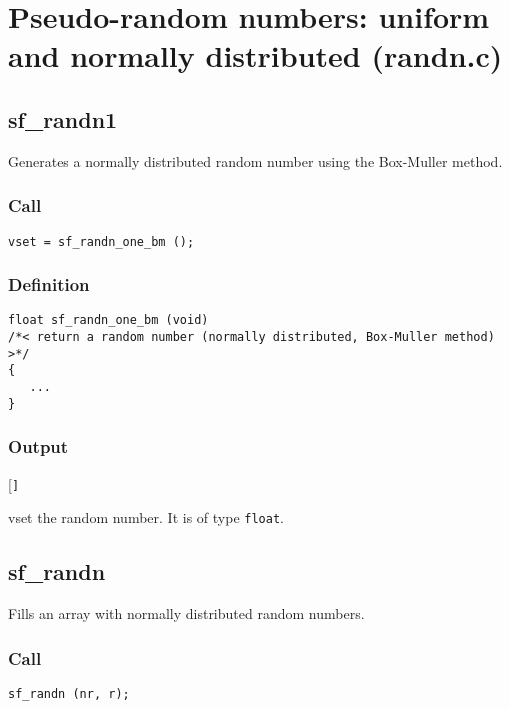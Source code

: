 \section{Pseudo-random numbers: uniform and normally distributed (randn.c)}




\subsection{{sf\_randn1}}
Generates a normally distributed random number using the Box-Muller method.

\subsubsection*{Call}
\begin{verbatim}vset = sf_randn_one_bm ();\end{verbatim}

\subsubsection*{Definition}
\begin{verbatim}
float sf_randn_one_bm (void)
/*< return a random number (normally distributed, Box-Muller method) >*/
{
   ...
}
\end{verbatim}

\subsubsection*{Output}
\begin{desclist}{\tt }{\quad}[\tt ]
   \setlength\itemsep{0pt}
   \item[vset] the random number. It is of type \texttt{float}.
\end{desclist}




\subsection{{sf\_randn}}
Fills an array with normally distributed random numbers.

\subsubsection*{Call}
\begin{verbatim}sf_randn (nr, r);\end{verbatim}

